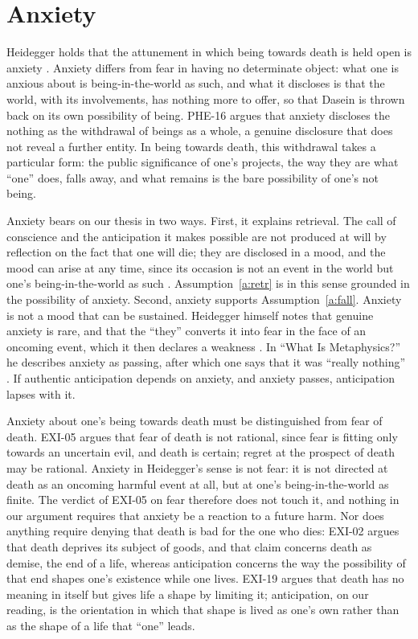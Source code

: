 \documentclass{situationist-preprint}
\begin{document}
\section{Anxiety}\label{s:anx}

Heidegger holds that the attunement in which being towards death is held open is anxiety \citep[\S\S 40, 53]{Heidegger1927}. Anxiety differs from fear in having no determinate object: what one is anxious about is being-in-the-world as such, and what it discloses is that the world, with its involvements, has nothing more to offer, so that Dasein is thrown back on its own possibility of being. PHE-16 argues that anxiety discloses the nothing as the withdrawal of beings as a whole, a genuine disclosure that does not reveal a further entity. In being towards death, this withdrawal takes a particular form: the public significance of one's projects, the way they are what \enquote{one} does, falls away, and what remains is the bare possibility of one's not being.

Anxiety bears on our thesis in two ways. First, it explains retrieval. The call of conscience and the anticipation it makes possible are not produced at will by reflection on the fact that one will die; they are disclosed in a mood, and the mood can arise at any time, since its occasion is not an event in the world but one's being-in-the-world as such \citep[\S 40]{Heidegger1927}. Assumption~\ref{a:retr} is in this sense grounded in the possibility of anxiety. Second, anxiety supports Assumption~\ref{a:fall}. Anxiety is not a mood that can be sustained. Heidegger himself notes that genuine anxiety is rare, and that the \enquote{they} converts it into fear in the face of an oncoming event, which it then declares a weakness \citep[\S 51]{Heidegger1927}. In \enquote{What Is Metaphysics?} he describes anxiety as passing, after which one says that it was \enquote{really nothing} \citep{Heidegger1929}. If authentic anticipation depends on anxiety, and anxiety passes, anticipation lapses with it.

Anxiety about one's being towards death must be distinguished from fear of death. EXI-05 argues that fear of death is not rational, since fear is fitting only towards an uncertain evil, and death is certain; regret at the prospect of death may be rational. Anxiety in Heidegger's sense is not fear: it is not directed at death as an oncoming harmful event at all, but at one's being-in-the-world as finite. The verdict of EXI-05 on fear therefore does not touch it, and nothing in our argument requires that anxiety be a reaction to a future harm. Nor does anything require denying that death is bad for the one who dies: EXI-02 argues that death deprives its subject of goods, and that claim concerns death as demise, the end of a life, whereas anticipation concerns the way the possibility of that end shapes one's existence while one lives. EXI-19 argues that death has no meaning in itself but gives life a shape by limiting it; anticipation, on our reading, is the orientation in which that shape is lived as one's own rather than as the shape of a life that \enquote{one} leads.
\end{document}
